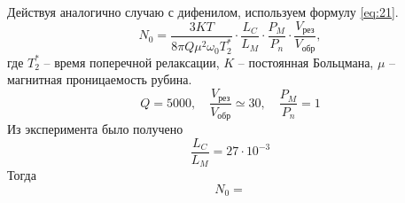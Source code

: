 Действуя аналогично случаю с дифенилом, используем формулу \eqref{eq:21}.
\begin{equation}
    \label{eq:21b}
    N_0 = \frac{3KT}{8 \pi Q \mu^2 \omega_0 T^*_2} \cdot \frac{L_C}{L_M} \cdot \frac{P_M}{P_n} \cdot \frac{V_{\text{рез}}}{V_{\text{обр}}},
\end{equation}
где $T_2^*$ -- время поперечной релаксации,  $K$ -- постоянная Больцмана,  $\mu$ -- магнитная проницаемость рубина.
\begin{equation}
    \label{eq:}
    Q = 5000, \quad \frac{V_{\text{рез}}}{V_{\text{обр}}} \simeq 30, \quad \frac{P_M}{P_n} = 1
\end{equation}
Из эксперимента было получено
\begin{equation}
    \frac{L_C}{L_M} = 27\cdot 10^{-3}
    \label{eq:}
\end{equation}
Тогда
\begin{equation}
    N_0 = 
    \label{eq:}
\end{equation}

